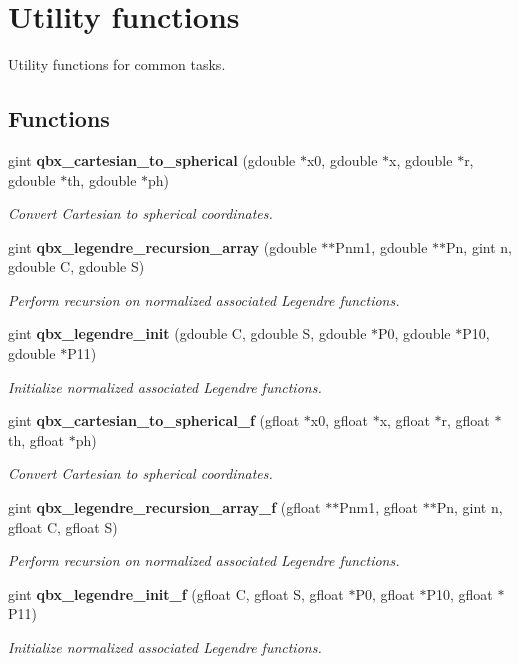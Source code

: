 \section{Utility functions}
\label{group__util}


Utility functions for common tasks.  


\subsection*{Functions}
\begin{DoxyCompactItemize}
\item 
gint {\bf qbx\+\_\+cartesian\+\_\+to\+\_\+spherical} (gdouble $\ast$x0, gdouble $\ast$x, gdouble $\ast$r, gdouble $\ast$th, gdouble $\ast$ph)
\begin{DoxyCompactList}\small\item\em Convert Cartesian to spherical coordinates. \end{DoxyCompactList}\item 
gint {\bf qbx\+\_\+legendre\+\_\+recursion\+\_\+array} (gdouble $\ast$$\ast$Pnm1, gdouble $\ast$$\ast$Pn, gint n, gdouble C, gdouble S)
\begin{DoxyCompactList}\small\item\em Perform recursion on normalized associated Legendre functions. \end{DoxyCompactList}\item 
gint {\bf qbx\+\_\+legendre\+\_\+init} (gdouble C, gdouble S, gdouble $\ast$P0, gdouble $\ast$P10, gdouble $\ast$P11)
\begin{DoxyCompactList}\small\item\em Initialize normalized associated Legendre functions. \end{DoxyCompactList}\item 
gint {\bf qbx\+\_\+cartesian\+\_\+to\+\_\+spherical\+\_\+f} (gfloat $\ast$x0, gfloat $\ast$x, gfloat $\ast$r, gfloat $\ast$th, gfloat $\ast$ph)
\begin{DoxyCompactList}\small\item\em Convert Cartesian to spherical coordinates. \end{DoxyCompactList}\item 
gint {\bf qbx\+\_\+legendre\+\_\+recursion\+\_\+array\+\_\+f} (gfloat $\ast$$\ast$Pnm1, gfloat $\ast$$\ast$Pn, gint n, gfloat C, gfloat S)
\begin{DoxyCompactList}\small\item\em Perform recursion on normalized associated Legendre functions. \end{DoxyCompactList}\item 
gint {\bf qbx\+\_\+legendre\+\_\+init\+\_\+f} (gfloat C, gfloat S, gfloat $\ast$P0, gfloat $\ast$P10, gfloat $\ast$P11)
\begin{DoxyCompactList}\small\item\em Initialize normalized associated Legendre functions. \end{DoxyCompactList}\end{DoxyCompactItemize}


